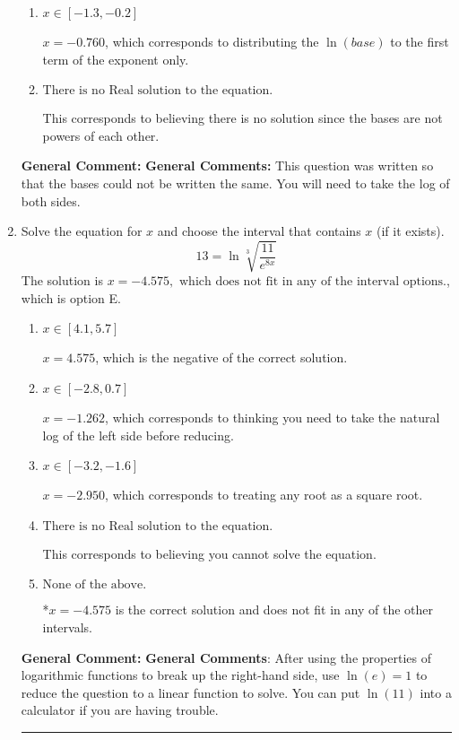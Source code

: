 \documentclass{extbook}[14pt]
\newcommand{\litem}[1]{\item #1

\rule{\textwidth}{0.4pt}}
\begin{document}
\begin{enumerate}
{\begin{enumerate}[label=\Alph*.]
$x = -3.500$, which corresponds to solving the numerators as equal while ignoring the bases are different.
\item \( x \in [-1.3, -0.2] \)

$x = -0.760$, which corresponds to distributing the $\ln(base)$ to the first term of the exponent only.
\item \( \text{There is no Real solution to the equation.} \)

This corresponds to believing there is no solution since the bases are not powers of each other.
\end{enumerate}

\textbf{General Comment:} \textbf{General Comments:} This question was written so that the bases could not be written the same. You will need to take the log of both sides.
}
\litem{
 Solve the equation for $x$ and choose the interval that contains $x$ (if it exists).
\[  13 = \ln{\sqrt[3]{\frac{11}{e^{8x}}}} \]The solution is \( x = -4.575, \text{ which does not fit in any of the interval options.} \), which is option E.\begin{enumerate}[label=\Alph*.]
\item \( x \in [4.1, 5.7] \)

$x = 4.575$, which is the negative of the correct solution.
\item \( x \in [-2.8, 0.7] \)

$x = -1.262$, which corresponds to thinking you need to take the natural log of the left side before reducing.
\item \( x \in [-3.2, -1.6] \)

$x = -2.950$, which corresponds to treating any root as a square root.
\item \( \text{There is no Real solution to the equation.} \)

This corresponds to believing you cannot solve the equation.
\item \( \text{None of the above.} \)

*$x = -4.575$ is the correct solution and does not fit in any of the other intervals.
\end{enumerate}

\textbf{General Comment:} \textbf{General Comments}: After using the properties of logarithmic functions to break up the right-hand side, use $\ln(e) = 1$ to reduce the question to a linear function to solve. You can put $\ln(11)$ into a calculator if you are having trouble.
}
\end{enumerate}
\end{document}
